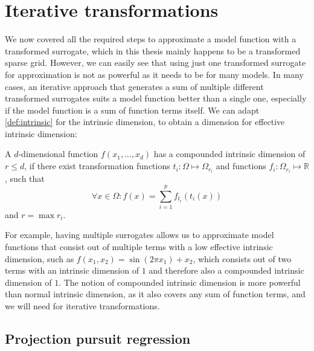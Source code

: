 \documentclass[
  a4paper,  %
  twoside,  %
  bibliography=totoc,
  headsepline,
  cleardoublepage=empty,
  parskip=half,
  draft=false
]{scrbook}
\begin{document}
\chapter{Iterative transformations}
\label{chap:c5}

We now covered all the required steps to approximate a model function with a transformed surrogate, which in this thesis mainly happens to be a transformed sparse grid.
However, we can easily see that using just one transformed surrogate for approximation is not as powerful as it needs to be for many models.
In many cases, an iterative approach that generates a sum of multiple different transformed surrogates suits a model function better than a single one, especially if the model function is a sum of function terms itself.
We can adapt \cref{def:intrinsic} for the intrinsic dimension, to obtain a dimension for effective intrinsic dimension:

\begin{definition}
A $d$-dimensional function $f(x_1, \dots, x_d)$ has a compounded intrinsic dimension of $r \leq d$, if there exist transformation functions $t_i \colon \Omega \mapsto \Omega_{r_i}$ and functions $f_i \colon \Omega_{r_i} \mapsto \mathds{R}$, such that
\begin{equation}
\forall x \in \Omega \colon f(x)=\sum_{i=1}^p f_{t_i}(t_i(x))
\end{equation}
and $r=\max r_i$.
\label{def:intrinsic_sum}
\end{definition}
%
For example, having multiple surrogates allows us to approximate model functions that consist out of multiple terms with a low effective intrinsic dimension, such as $f(x_1, x_2)=\sin(2 \pi x_1) + x_2$, which consists out of two terms with an intrinsic dimension of $1$ and therefore also a compounded intrinsic dimension of $1$.
The notion of compounded intrinsic dimension is more powerful than normal intrinsic dimension, as it also covers any sum of function terms, and we will need for iterative transformations.

\section{Projection pursuit regression}
\end{document}
